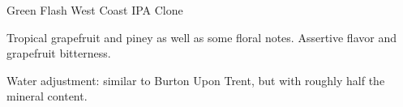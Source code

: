 \begin{recipe}{Green Flash West Coast IPA Clone}

\begin{aboutblock}
Tropical grapefruit and piney as well as some floral notes. Assertive flavor
and grapefruit bitterness. 
\end{aboutblock}


\begin{methodandtiming}
 
\begin{mashsteps}
\end{mashsteps}

\begin{fermentationsteps}
\end{fermentationsteps}

\begin{directions}
Water adjustment: similar to Burton Upon Trent, but with roughly half the
mineral content.
\end{directions}

\end{methodandtiming}

\recipebreak

\begin{ingredientsblock}

\begin{malts}
\end{malts}

\begin{hops}
\end{hops}


\end{ingredientsblock}

\end{recipe}

